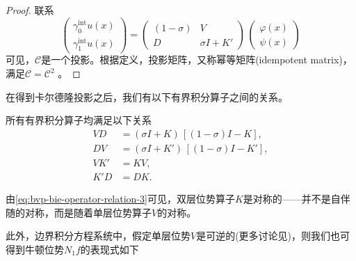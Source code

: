 \begin{proof}
联系
\begin{equation*}
  \begin{pmatrix}
    \gamma_{0}^{\text{int}} u(x) \\
    \gamma_{1}^{\text{int}} u(x)
  \end{pmatrix}
  =
  \begin{pmatrix}
    \left( 1-\sigma \right) & V \\
    D & \sigma I + K'
  \end{pmatrix}
  \,
  \begin{pmatrix}
    \varphi(x) \\
    \psi(x)
  \end{pmatrix}
\end{equation*}
可见，$\mathcal{C}$是一个投影。根据定义，投影矩阵，又称幂等矩阵(idempotent matrix)，满足$\mathcal{C} = \mathcal{C}^{2}$ \citep[p.464]{Seber:2003wu}。
\end{proof}

在得到卡尔德隆投影之后，我们有以下有界积分算子之间的关系。
\begin{corollary}[有界积分算子之间的关系]
  所有有界积分算子均满足以下关系
  \begin{align}
    \label{eq:bvp-bie-operator-relation-1}
    V D &= \left( \sigma I + K \right) \, \left[ \left( 1-\sigma \right) I - K \right],\\
    \label{eq:bvp-bie-operator-relation-2}
    D V &=  \left( \sigma I + K' \right) \, \left[ \left( 1-\sigma \right) I - K' \right],\\
    \label{eq:bvp-bie-operator-relation-3}
    V K' &= K V, \\
    \label{eq:bvp-bie-operator-relation-4}
    K' D &= D K.
  \end{align}
\end{corollary}
由\eqref{eq:bvp-bie-operator-relation-3}可见，双层位势算子$K$是对称的——并不是自伴随的对称，而是随着单层位势算子$V$的对称。

此外，边界积分方程系统中，假定单层位势$V$是可逆的(更多讨论见)，则我们也可得到牛顿位势$N_{1}f$的表现式如下

